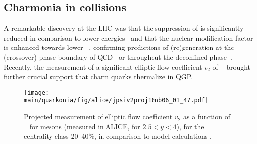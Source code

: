 \documentclass[../report.tex]{subfiles}
\providecommand{\main}{..}
\begin{document}


\subsection{Charmonia in \PbPb collisions} %

A remarkable discovery at the LHC was that the suppression of \PJgy is significantly reduced in comparison to lower energies~\cite{Abelev:2012rv} and that the nuclear modification factor \raa is enhanced towards lower \pT~\cite{Abelev:2013ila,Adam:2016rdg}, confirming predictions of (re)generation at the (crossover) phase boundary of QCD~\cite{BraunMunzinger:2000px} or throughout the deconfined phase~\cite{Thews:2000rj,Zhao:2011cv}. 
Recently, the measurement of a significant elliptic flow coefficient $v_2$ of \PJgy~\cite{Khachatryan:2016ypw,Acharya:2017tgv,Aaboud:2018ttm} brought further crucial support that charm quarks thermalize in QGP.



  
\begin{figure}[h]
\begin{center}
 \texttt{[image: \\main/quarkonia/fig/alice/jpsiv2proj10nb06\_01\_47.pdf]}
\end{center}
 \caption{Projected measurement of elliptic flow coefficient $v_2$ as a function of \pT~ for \PJgy mesons (measured in ALICE, for $2.5<y<4$), for the centrality class 20--40\%, in comparison to model calculations \cite{Du:2015wha}.}
\label{FigQ:v2pTPbPb}
\end{figure}
\end{document}
